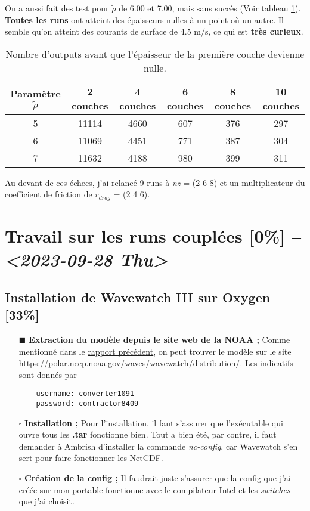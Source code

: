 \documentclass[10pt]{article}
\numberwithin{equation}{section}
\renewcommand{\boxtimes}{\blacksquare}
\begin{document}
On a aussi fait des test pour \(\tilde{\rho}\) de 6.00 et 7.00, mais sans succès (Voir tableau \ref{tab:orge962328}).
\textbf{Toutes les runs} ont atteint des épaisseurs nulles à un point où un autre.
Il semble qu'on atteint des courants de surface de 4.5 m/s, ce qui est \textbf{très curieux}.

\begin{table}[htbp]
\caption{\label{tab:orge962328}Nombre d'outputs avant que l'épaisseur de la première couche devienne nulle.}
\centering
\begin{tabular}{cccccc}
\hline
\hline
Paramètre \(\tilde{\rho}\) & 2 couches & 4 couches & 6 couches & 8 couches & 10 couches\\
\hline
5 & 11114 & 4660 & 607 & 376 & 297\\
6 & 11069 & 4451 & 771 & 387 & 304\\
7 & 11632 & 4188 & 980 & 399 & 311\\
\hline
\end{tabular}
\end{table}

Au devant de ces échecs, j'ai relancé 9 runs à \emph{nz} = (2 6 8) et un multiplicateur du coefficient de friction de \(r_{drag}\) = (2 4 6).
\section{Travail sur les runs couplées [0\%] -- \textit{<2023-09-28 Thu>}}
\label{sec:orgd948936}

\subsection{Installation de Wavewatch III sur Oxygen [33\%]}
\label{sec:org35dc6ed}
\begin{itemize}
\item[{$\boxtimes$}] \textbf{Extraction du modèle depuis le site web de la NOAA ;}
Comme mentionné dans le \href{rapport-2023-09-22.pdf}{rapport précédent}, on peut trouver le modèle sur le site \url{https://polar.ncep.noaa.gov/waves/wavewatch/distribution/}.
Les indicatifs sont donnés par
\begin{verbatim}
    username: converter1091
    password: contractor8409
\end{verbatim}
\item[{$\square$}] \textbf{Installation ;}
Pour l'installation, il faut s'assurer que l'exécutable qui ouvre tous les \textbf{.tar} fonctionne bien.
Tout a bien été, par contre, il faut demander à Ambrish d'installer la commande \emph{nc-config}, car Wavewatch s'en sert pour faire fonctionner les NetCDF.
\item[{$\square$}] \textbf{Création de la config ;}
Il faudrait juste s'assurer que la config que j'ai créée sur mon portable fonctionne avec le compilateur Intel et les \emph{switches} que j'ai choisit.
\end{itemize}
\end{document}
